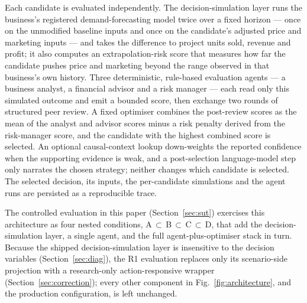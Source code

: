 \documentclass[10pt,twocolumn,a4paper]{article}
\begin{document}
Each candidate is evaluated independently. The decision-simulation layer runs
the business's registered demand-forecasting model twice over a fixed horizon
--- once on the unmodified baseline inputs and once on the candidate's adjusted
price and marketing inputs --- and takes the difference to project units sold,
revenue and profit; it also computes an extrapolation-risk score that measures
how far the candidate pushes price and marketing beyond the range observed in
that business's own history. Three deterministic, rule-based evaluation agents
--- a business analyst, a financial advisor and a risk manager --- each read
only this simulated outcome and emit a bounded score, then exchange two rounds
of structured peer review. A fixed optimiser combines the post-review scores as
the mean of the analyst and advisor scores minus a risk penalty derived from the
risk-manager score, and the candidate with the highest combined score is
selected. An optional causal-context lookup down-weights the reported confidence
when the supporting evidence is weak, and a post-selection language-model step
only narrates the chosen strategy; neither changes which candidate is selected.
The selected decision, its inputs, the per-candidate simulations and the agent
runs are persisted as a reproducible trace.

The controlled evaluation in this paper (Section~\ref{sec:sut}) exercises this
architecture as four nested conditions, A\,$\subset$\,B\,$\subset$\,C\,$\subset$\,D,
that add the decision-simulation layer, a single agent, and the full
agent-plus-optimiser stack in turn. Because the shipped decision-simulation
layer is insensitive to the decision variables (Section~\ref{sec:diag}), the R1
evaluation replaces only its scenario-side projection with a research-only
action-responsive wrapper (Section~\ref{sec:correction}); every other component
in Fig.~\ref{fig:architecture}, and the production configuration, is left
unchanged.
\end{document}

